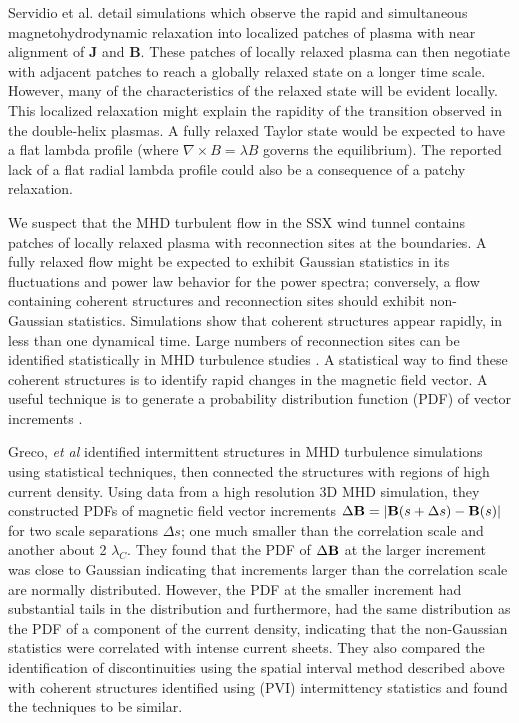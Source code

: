 \documentclass[12pt]{iopart}
\begin{document}
Servidio et al. \cite{Servidio08,Servidio11} detail simulations which observe the rapid and simultaneous magnetohydrodynamic relaxation into localized patches of plasma with near alignment of {\bf J} and {\bf B}. These patches of locally relaxed plasma can then negotiate with adjacent patches to reach a globally relaxed state on a longer time scale.  However, many of the characteristics of the relaxed state will be evident locally. This localized relaxation might explain the rapidity of the transition observed in the double-helix plasmas.  A fully relaxed Taylor state would be expected to have a flat lambda profile (where $\nabla \times B = \lambda B$ governs the equilibrium).  The reported lack of a flat radial lambda profile could also be a consequence of a patchy relaxation.

We suspect that the MHD turbulent flow in the SSX wind tunnel contains patches of locally relaxed plasma with reconnection sites at the boundaries.  A fully relaxed flow might be expected to exhibit Gaussian statistics in its fluctuations and power law behavior for the power spectra; conversely, a flow containing coherent structures and reconnection sites should exhibit non-Gaussian statistics.  Simulations show that coherent structures appear rapidly, in less than one dynamical time.  Large numbers of reconnection sites can be identified statistically in MHD turbulence studies \cite{Servidio09,Servidio10a}.  A statistical way to find these coherent structures is to identify rapid changes in the magnetic field vector.  A useful technique is to generate a probability distribution function (PDF) of vector increments \cite{Greco08,Greco09}.

Greco, {\it et al} \cite{Greco08} identified intermittent structures in MHD turbulence simulations using statistical techniques, then connected the structures with regions of high current density.  Using data from a high resolution 3D MHD simulation, they constructed PDFs of magnetic field vector increments $\Delta {\bf B} = |{\bf B}(s + \Delta s) - {\bf B}(s)|$ for two scale separations $\Delta s$; one much smaller than the correlation scale and another about 2 $\lambda_C$.  They found that the PDF of $\Delta {\bf B}$ at the larger increment was close to Gaussian indicating that increments larger than the correlation scale are normally distributed.  However, the PDF at the smaller increment had substantial tails in the distribution and furthermore, had the same distribution as the PDF of a component of the current density, indicating that the non-Gaussian statistics were correlated with intense current sheets.  They also compared the identification of  discontinuities using the spatial interval method described above with coherent structures identified using (PVI) intermittency statistics and found the techniques to be similar.
\end{document}
